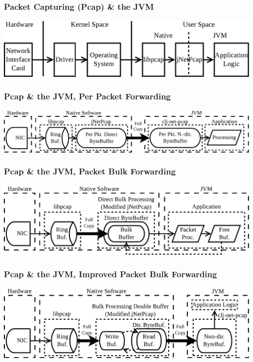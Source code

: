 \documentclass[aspectratio=169]{beamer}
\begin{document}
  \begin{frame}
      \frametitle{Packet Capturing (Pcap) \& the JVM}

      \begin{center}
          \includegraphics[width=15cm]{images/packet_capturing_data_flow}
      \end{center}
  \end{frame}

  \begin{frame}
      \frametitle{Pcap \& the JVM, Per Packet Forwarding}

      \begin{center}
          \includegraphics[width=15cm]{images/jnetpcap_byte_buffer}
      \end{center}
  \end{frame}

  \begin{frame}
      \frametitle{Pcap \& the JVM, Packet Bulk Forwarding}

      \begin{center}
          \includegraphics[width=15cm]{images/modified_jnetpcap_bulk_processing_direct_buffer}
      \end{center}
  \end{frame}

  \begin{frame}
      \frametitle{Pcap \& the JVM, Improved Packet Bulk Forwarding}

      \begin{center}
          \includegraphics[width=15cm]{images/modified_jnetpcap_bulk_processing_double_buffer}
      \end{center}
  \end{frame}
\end{document}
